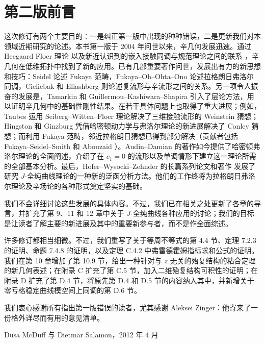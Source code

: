 
\chapter*{第二版前言}

这次修订有两个主要目的：一是纠正第一版中出现的种种错误，二是更新我们对本领域近期研究的论述。本书第一版于 2004 年问世以来，辛几何发展迅速。通过 Heegaard Floer 理论  以及新近认识到的嵌入接触同调与规范理论之间的联系 ，辛几何在低维拓扑中找到了新的应用。已有几部重要著作问世，发展出有力的新思想和技巧：Seidel  论述 Fukaya 范畴，Fukaya--Oh--Ohta--Ono  论述拉格朗日弗洛尔同调，Cieliebak 和 Eliashberg  则论述复流形与辛流形之间的关系。另一项令人振奋的发展是，Tamarkin  和 Guillermou--Kashiwara--Shapira  引入了层论方法，用以证明辛几何中的基础性刚性结果。在若干具体问题上也取得了重大进展；例如，Taubes  运用 Seiberg--Witten--Floer 理论解决了三维接触流形的 Weinstein 猜想；Hingston  和 Ginzburg  凭借哈密顿动力学与弗洛尔理论的新进展解决了 Conley 猜想；而利用 Fukaya 范畴，邻近拉格朗日猜想已得到部分解决（贡献者包括 Fukaya--Seidel--Smith  和 Abouzaid ）。Audin--Damian  的著作如今提供了哈密顿弗洛尔理论的全面阐述，介绍了在 $c_1=0$ 的流形以及单调情形下建立这一理论所需的全部基本分析。最后，Hofer--Wysocki--Zehnder 的长篇系列论文和著作  发展了研究 $J$-全纯曲线理论的一种新的泛函分析方法。他们的工作终将为拉格朗日弗洛尔理论及辛场论的各种形式奠定坚实的基础。

我们不会详细讨论这些发展的具体内容。不过，我们已在相关之处更新了各章的导言，并扩充了第 9、11 和 12 章中关于 $J$-全纯曲线各种应用的讨论；我们的目标是让读者了解主要的新进展及其中的重要新参与者，而不是作全面综述。

许多修订都相当细微。不过，我们重写了关于等周不等式的第 4.4 节、定理 7.2.3 的证明、命题 7.4.8 的证明，以及定理 C.4.2 中弗雷德霍姆指标求和公式的证明。我们在第 10 章增加了第 10.9 节，给出一种针对与 $z$ 无关的殆复结构的粘合定理的新几何表述；在附录 C 扩充了第 C.5 节，加入二维殆复结构可积性的证明；在附录 D 扩充了第 D.4 节，将原先第 D.4 和 D.5 节的内容纳入其中，并新增关于零亏格稳定曲线模空间上同调的第 D.6 节。

我们衷心感谢所有指出第一版错误的读者，尤其感谢 Aleksei Zinger：他寄来了一份格外详尽而有用的意见清单。

\begin{flushright}
Dusa McDuff 与 Dietmar Salamon，2012 年 4 月
\end{flushright}
